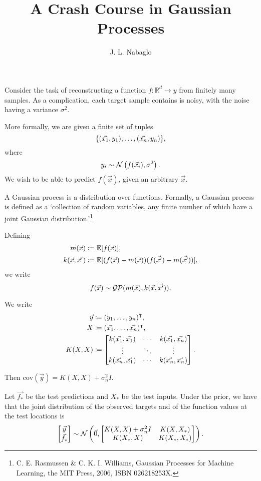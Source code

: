 \documentclass{article}
\title{A Crash Course in Gaussian Processes}
\author{J. L. Nabaglo}
\newcommand\bE{\mathbb{E}}
\newcommand\bR{\mathbb{R}}
\newcommand\cG{\mathcal{G}}
\newcommand\cN{\mathcal{N}}
\newcommand\cP{\mathcal{P}}
\newcommand\cov{\mathrm{cov}}
\begin{document}
\maketitle

Consider the task of reconstructing a function $f: \bR^d \to y$ from finitely many samples. As a complication, each target sample contains is noisy, with the noise having a variance $\sigma^2$.

More formally, we are given a finite set of tuples\[
    \{ (\vec{x_1}, y_1), \dots, (\vec{x_n}, y_n) \}\text,
\] where \[
    y_i \sim \cN\left(f(\vec{x_i}), \sigma^2\right)\text.
\] We wish to be able to predict $f(\vec{x})$, given an arbitrary $\vec{x}$.

A Gaussian process is a distribution over functions. Formally, a Gaussian process is defined as a `collection of random variables, any finite number of which have a joint Gaussian distribution.'\footnote{C. E. Rasmussen \& C. K. I. Williams, Gaussian Processes for Machine Learning, the MIT Press, 2006, ISBN 026218253X.}

Defining \begin{align*}
    m(\vec{x}) &\coloneqq \bE[f(\vec{x})] \text, \\
    k(\vec{x}, \vec{x}') &\coloneqq \bE[(f(\vec{x}) - m(\vec{x}))(f(\vec{x'}) - m(\vec{x'}))],
\end{align*} we write \[
    f(\vec{x}) \sim \cG\cP(m(\vec{x}), k(\vec{x}, \vec{x'}))\text.
\]

We write \begin{align*}
    \vec y &\coloneqq (y_1, \dots, y_n)^\intercal \text, \\
    X &\coloneqq (\vec{x_1}, \dots, \vec{x_n})^\intercal \text, \\
    K(X, X) &\coloneqq \begin{bmatrix}
        k(\vec{x_1}, \vec{x_1}) & \cdots & k(\vec{x_1}, \vec{x_n}) \\
        \vdots & \ddots & \vdots \\
        k(\vec{x_n}, \vec{x_1}) & \cdots & k(\vec{x_n}, \vec{x_n})
    \end{bmatrix}\text.
\end{align*}

Then $\cov(\vec{y}) = K(X, X) + \sigma_n^2I$.

Let $\vec{f_*}$ be the test predictions and $X_*$ be the test inputs. Under the prior, we have that the joint distribution of the observed targets and of the function values at the test locations is \[
    \begin{bmatrix}
        \vec{y} \\ \vec{f_*}
    \end{bmatrix} \sim \cN\left(\vec0, \begin{bmatrix}
        K(X, X) + \sigma_n^2I & K(X, X_*) \\
        K(X_*, X) & K(X_*, X_*)
    \end{bmatrix}\right)\text.
\]
\end{document}
